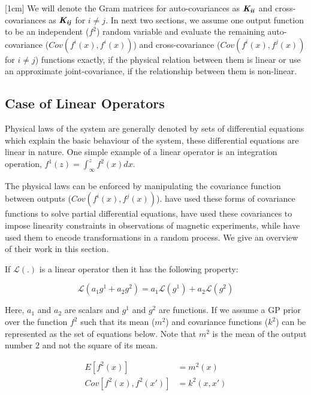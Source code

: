 [1cm]
We will denote the Gram matrices for auto-covariances as $\bm{\mathit{K_{ii}}}$ and cross-covariances as $\bm{\mathit{K_{ij}}}$ for $i \neq j$. In next two sections, we assume one output function to be an independent ($f^2$) random variable and evaluate the remaining auto-covariance ($Cov(f^i(x), f^i(x))$) and cross-covariance ($Cov(f^i(x), f^j(x))$ for $i \neq j$) functions exactly, if the physical relation between them is linear or use an approximate joint-covariance, if the relationship between them is non-linear\cite{Constantinescu2013}.

\subsection{Case of Linear Operators}\label{subsecLinearOperators}
Physical laws of the system are generally denoted by sets of differential equations which explain the basic behaviour of the system, these differential equations are linear in nature. One simple example of a linear operator is an integration operation, $f^1(z) = \int_{\infty}^z f^2(x)dx$. 

The physical laws can be enforced by manipulating the covariance function between outputs ($Cov(f^i(x), f^j(x))$). \cite{journals/jmlr/AlvarezLL09, sarkka2011linear} have used these forms of covariance functions to solve partial differential equations, \cite{jidling2017linearly} have used these covariances to impose linearity constraints in observations of magnetic experiments, while \cite{ginsbourger2013invariances} have used them to encode transformations in a random process. We give an overview of their work in this section. 

If $\mathcal{L} (.)$ is a linear operator then it has the following property:

\begin{equation}
    \mathcal{L} (a_1g^1 + a_2g^2) = a_1\mathcal{L}(g^1) + a_2\mathcal{L}(g^2) 
\end{equation}

Here, $a_1$ and $a_2$ are scalars and $g^1$ and $g^2$ are functions. If we assume a GP prior over the function $f^2$ such that its mean ($m^2$) and covariance functions ($k^2$) can be represented as the set of equations below. Note that $m^2$ is the mean of the output number $2$ and not the square of its mean.

\begin{align}
E[f^2(x)] & = m^2(x) \\
Cov[f^2(x), f^2(x')] & = k^2(x, x')
\end{align}

